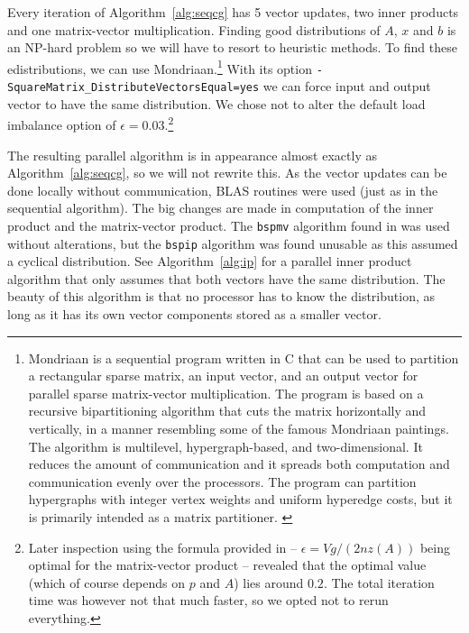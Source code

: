 \documentclass[11pt]{amsart}
\theoremstyle{definition}
\begin{document}
Every iteration of Algorithm~\ref{alg:seqcg} has 5 vector updates, two inner products and one matrix-vector multiplication. Finding good distributions of $A$, $x$ and $b$ is an NP-hard problem so we will have to resort to heuristic methods. To find these edistributions, we can use Mondriaan.\footnote{Mondriaan is a sequential program written in C that can be used to partition a rectangular sparse matrix, an input vector, and an output vector for parallel sparse matrix-vector multiplication. The program is based on a recursive bipartitioning algorithm that cuts the matrix horizontally and vertically, in a manner resembling some of the famous Mondriaan paintings. The algorithm is multilevel, hypergraph-based, and two-dimensional. It reduces the amount of communication and it spreads both computation and communication evenly over the processors. The program can partition hypergraphs with integer vertex weights and uniform hyperedge costs, but it is primarily intended as a matrix partitioner. \cite{mondriaan}} With its option \texttt{-SquareMatrix\_DistributeVectorsEqual=yes} we can force input and output vector to have the same distribution. We chose not to alter the default load imbalance option of $\epsilon = 0.03$.\footnote{Later inspection using the formula provided in \cite[p.~189]{biss04} -- $\epsilon = Vg/(2nz(A))$ being optimal for the matrix-vector product -- revealed that the optimal value (which of course depends on $p$ and $A$) lies around $0.2$. The total iteration time was however not that much faster, so we opted not to rerun everything.}

The resulting parallel algorithm is in appearance almost exactly as Algorithm~\ref{alg:seqcg}, so we will not rewrite this. As the vector updates can be done locally without communication, BLAS routines were used (just as in the sequential algorithm). The big changes are made in computation of the inner product and the matrix-vector product. The \texttt{bspmv} algorithm found in \cite[Alg.~4.5]{biss04} was used without alterations, but the \texttt{bspip} algorithm \cite[Alg.~1.1]{biss04} was found unusable as this assumed a cyclical distribution. See Algorithm~\ref{alg:ip} for a parallel inner product algorithm that only assumes that both vectors have the same distribution. The beauty of this algorithm is that no processor has to know the distribution, as long as it has its own vector components stored as a smaller vector.
\end{document}
